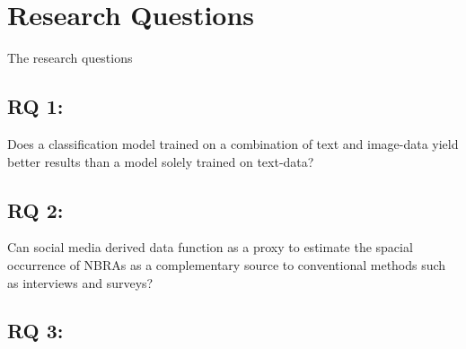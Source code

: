 \chapter{Research Questions} \label{research_questions}
The research questions 


\section{RQ 1:}
Does a classification model trained on a combination of text and image-data yield better results than a model solely trained on text-data?

\section{RQ 2:}
Can social media derived data function as a proxy to estimate the spacial occurrence of NBRAs as a complementary source to conventional methods such as interviews and surveys?

\section{RQ 3:}



